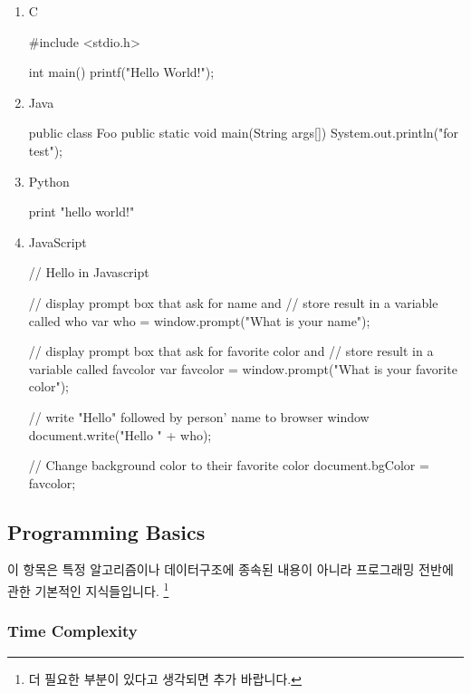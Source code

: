 \begin{enumerate}

\item C


\begin{C}
#include <stdio.h> 

int main()
{
	printf("Hello World!\n"); 
}
\end{C}

\item Java


\begin{Java}
public class Foo {
  public static void main(String args[]) {
    System.out.println("for test");
  }
}
\end{Java}

\item{Python}

\begin{Python}
print "hello world!"
\end{Python}

\item JavaScript

\begin{JavaScript}
// Hello in Javascript

// display prompt box that ask for name and 
// store result in a variable called who
var who = window.prompt("What is your name");

// display prompt box that ask for favorite color and 
// store result in a variable called favcolor
var favcolor = window.prompt("What is your favorite color");

// write "Hello" followed by person' name to browser window
document.write("Hello " + who);

// Change background color to their favorite color
document.bgColor = favcolor;
\end{JavaScript}

\end{enumerate}

\subsection{Programming Basics}

이 항목은 특정 알고리즘이나 데이터구조에 종속된 내용이 아니라 프로그래밍 전반에 관한 기본적인 지식들입니다. \footnote{더 필요한 부분이 있다고 생각되면 추가 바랍니다.} 

\subsubsection{Time Complexity} 

